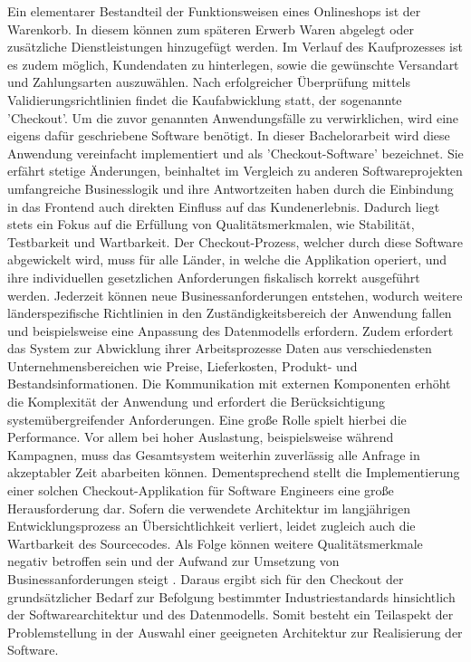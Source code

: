 Ein elementarer Bestandteil der Funktionsweisen eines Onlineshops ist der Warenkorb. In diesem können zum späteren Erwerb Waren abgelegt oder zusätzliche Dienstleistungen hinzugefügt werden. Im Verlauf des Kaufprozesses ist es zudem möglich, Kundendaten zu hinterlegen, sowie die gewünschte Versandart und Zahlungsarten auszuwählen. Nach erfolgreicher Überprüfung mittels Validierungsrichtlinien findet die Kaufabwicklung statt, der sogenannte 'Checkout'. Um die zuvor genannten Anwendungsfälle zu verwirklichen, wird eine eigens dafür geschriebene Software benötigt. In dieser Bachelorarbeit wird diese Anwendung vereinfacht implementiert und als 'Checkout-Software' bezeichnet. Sie erfährt stetige Änderungen, beinhaltet im Vergleich zu anderen Softwareprojekten umfangreiche Businesslogik und ihre Antwortzeiten haben durch die Einbindung in das Frontend auch direkten Einfluss auf das Kundenerlebnis. Dadurch liegt stets ein Fokus auf die Erfüllung von Qualitätsmerkmalen, wie Stabilität, Testbarkeit und Wartbarkeit. Der Checkout-Prozess, welcher durch diese Software abgewickelt wird, muss für alle Länder, in welche die Applikation operiert, und ihre individuellen gesetzlichen Anforderungen fiskalisch korrekt ausgeführt werden. Jederzeit können neue Businessanforderungen entstehen, wodurch weitere länderspezifische Richtlinien in den Zuständigkeitsbereich der Anwendung fallen und beispielsweise eine Anpassung des Datenmodells erfordern. Zudem erfordert das System zur Abwicklung ihrer Arbeitsprozesse Daten aus verschiedensten Unternehmensbereichen wie Preise, Lieferkosten, Produkt- und Bestandsinformationen. Die Kommunikation mit externen Komponenten erhöht die Komplexität der Anwendung und erfordert die Berücksichtigung systemübergreifender Anforderungen. Eine große Rolle spielt hierbei die Performance. Vor allem bei hoher Auslastung, beispielsweise während Kampagnen, muss das Gesamtsystem weiterhin zuverlässig alle Anfrage in akzeptabler Zeit abarbeiten können. Dementsprechend stellt die Implementierung einer solchen Checkout-Applikation für Software Engineers eine große Herausforderung dar. Sofern die verwendete Architektur im langjährigen Entwicklungsprozess an Übersichtlichkeit verliert, leidet zugleich auch die Wartbarkeit des Sourcecodes. Als Folge können weitere Qualitätsmerkmale negativ betroffen sein und der Aufwand zur Umsetzung von Businessanforderungen steigt \cite[S. 3f.]{Pigoski.2001}. Daraus ergibt sich für den Checkout der grundsätzlicher Bedarf zur Befolgung bestimmter Industriestandards hinsichtlich der Softwarearchitektur und des Datenmodells. Somit besteht ein Teilaspekt der Problemstellung in der Auswahl einer geeigneten Architektur zur Realisierung der Software. 


